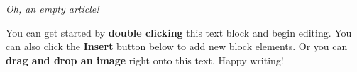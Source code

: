 \textit{Oh, an empty article!} 

You can get started by \textbf{double clicking} this text block and begin editing. You can also click the \textbf{Insert} button below to add new block elements. Or you can \textbf{drag and drop an image} right onto this text. Happy writing!
    